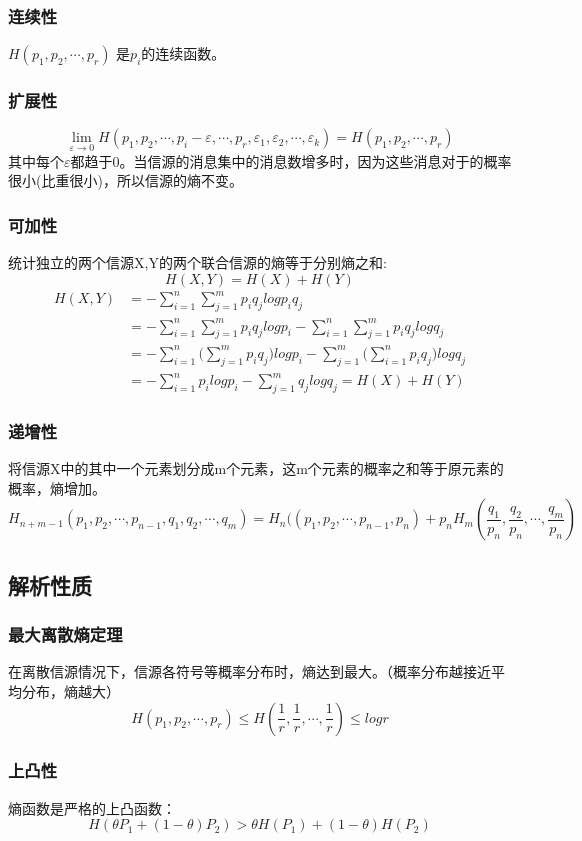 \documentclass[UTF8]{ctexart} %
\begin{document}
			\subsubsection{连续性}
				$H(p_1,p_2,\cdots,p_r)$ 是$p_i$的连续函数。
			\subsubsection{扩展性}
				\[\lim_{\varepsilon\rightarrow0}H(p_1,p_2,\cdots,p_i-\varepsilon,\cdots,p_r,\varepsilon_1,\varepsilon_2,\cdots,\varepsilon_k)=H(p_1,p_2,\cdots,p_r)\]
				其中每个$\varepsilon$都趋于0。当信源的消息集中的消息数增多时，因为这些消息对于的概率很小(比重很小)，所以信源的熵不变。
			\subsubsection{可加性}
				统计独立的两个信源X,Y的两个联合信源的熵等于分别熵之和:
				\[H(X,Y) = H(X)+H(Y)\]	
				\[\begin{aligned}
					H(X,Y)&=-\sum_{i=1}^n\sum_{j=1}^mp_iq_jlogp_iq_j\\
					& =-\sum_{i=1}^n\sum_{j=1}^mp_iq_jlogp_i-\sum_{i=1}^n\sum_{j=1}^mp_iq_jlogq_j\\
					& =-\sum_{i=1}^n\big(\sum_{j=1}^mp_iq_j\big)logp_i-\sum_{j=1}^m\big(\sum_{i=1}^np_iq_j\big)logq_j\\
					& =-\sum_{i=1}^np_ilogp_i-\sum_{j=1}^mq_jlogq_j = H(X)+H(Y)
				\end{aligned}\]
			\subsubsection{递增性}
				将信源X中的其中一个元素划分成m个元素，这m个元素的概率之和等于原元素的概率，熵增加。
				\[H_{n+m-1}(p_1,p_2,\cdots,p_{n-1},q_1,q_2,\cdots,q_m) = H_n((p_1,p_2,\cdots,p_{n-1},p_n)
				+p_nH_m(\frac{q_1}{p_n},\frac{q_2}{p_n},\cdots,\frac{q_m}{p_n})\]
		\subsection{解析性质}
			\subsubsection{最大离散熵定理}
				在离散信源情况下，信源各符号等概率分布时，熵达到最大。（概率分布越接近平均分布，熵越大）
				\[H(p_1,p_2,\cdots, p_r) \leq H(\frac{1}{r},\frac{1}{r},\cdots,\frac{1}{r})\leq logr\]
			\subsubsection{上凸性}
				熵函数是严格的上凸函数：
				\[H(\theta P_1+(1-\theta) P_2) > \theta H( P_1)+(1-\theta)H(P_2)\]
\end{document}
